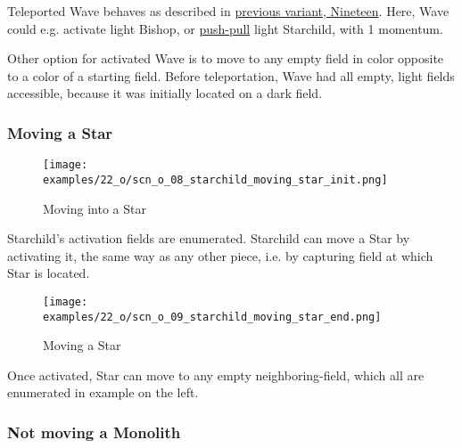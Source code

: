 Teleported Wave behaves as described in
\hyperref[fig:scn_n_04_teleport_move_3]{previous variant, Nineteen}.
Here, Wave could e.g. activate light Bishop, or
\hyperref[sec:Terms/Push-pull activation]{push-pull} light Starchild, with 1 momentum.

Other option for activated Wave is to move to any empty field in color opposite to a
color of a starting field. Before teleportation, Wave had all empty, light fields
accessible, because it was initially located on a dark field.

\clearpage %

\subsubsection*{Moving a Star}

\vspace*{-0.9\baselineskip}
\noindent
\begin{wrapfigure}[5]{l}{0.4\textwidth}
\centering
\texttt{[image: examples/22\_o/scn\_o\_08\_starchild\_moving\_star\_init.png]}
\caption{Moving into a Star}
\label{fig:scn_o_08_starchild_moving_star_init}
\end{wrapfigure}
Starchild's activation fields are enumerated. Starchild can move a Star by activating it,
the same way as any other piece, i.e. by capturing field at which Star is located.

\vspace*{2.1\baselineskip}
\noindent
\begin{wrapfigure}[4]{l}{0.4\textwidth}
\centering
\texttt{[image: examples/22\_o/scn\_o\_09\_starchild\_moving\_star\_end.png]}
\caption{Moving a Star}
\label{fig:scn_o_09_starchild_moving_star_end}
\end{wrapfigure}
Once activated, Star can move to any empty neighboring-field, which all are enumerated in
example on the left.

\clearpage %

\subsubsection*{Not moving a Monolith}

